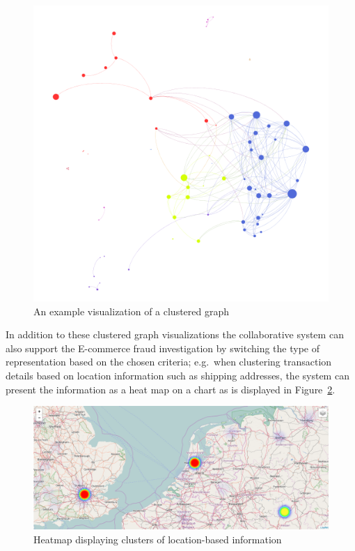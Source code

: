 \begin{figure}[H]
  \centering
  \includegraphics[width=0.8\columnwidth]{images/GraphViz.png}
  \caption[An example visualization of a clustered graph]{An example visualization of a clustered graph \citep{griffsgraphs}}
\label{fig:images_graph_viz}
\end{figure}

 In addition to these clustered graph visualizations the collaborative system can also support the \gls{E-commerce} fraud investigation by switching the type of representation based on the chosen criteria; e.g.\ when clustering transaction details based on location information such as shipping addresses, the system can present the information as a heat map on a chart as is displayed in Figure~\ref{fig:images_map_heatmap}. \@

\begin{figure}[H]
  \centering
  \includegraphics[width=0.9\columnwidth]{images/Heatmap.png}
  \caption{Heatmap displaying clusters of location-based information}
\label{fig:images_map_heatmap}
\end{figure}

